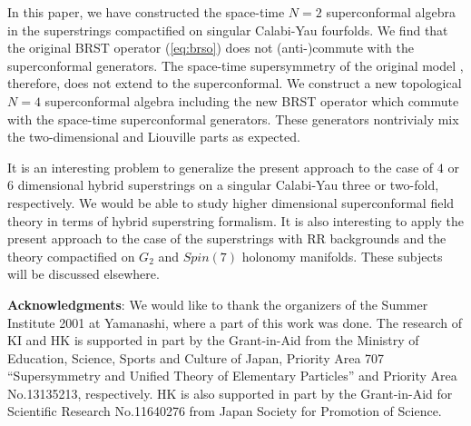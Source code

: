 \documentclass[a4paper,12pt]{article}
\begin{document}
In this paper, we have constructed the space-time $N=2$
superconformal algebra in the superstrings compactified
on singular Calabi-Yau fourfolds. We find that the original
BRST operator (\ref{eq:brso}) does not (anti-)commute with the 
superconformal
generators. The space-time supersymmetry of the original model
\cite{GKP}, therefore, does not extend to the superconformal.
We construct a new topological $N=4$ superconformal algebra
including the new BRST operator which commute with
the space-time superconformal generators. These generators
nontrivialy mix the two-dimensional and Liouville parts
as expected.

It is an interesting problem to generalize the present approach to the
case of $4$ or $6$ dimensional hybrid superstrings on a singular
Calabi-Yau three or two-fold, respectively. 
We would be able to study higher dimensional
superconformal field theory in terms of hybrid superstring formalism.
It is also interesting to apply the present approach to the case of 
the superstrings with RR backgrounds \cite{BeVaWi}
and the theory compactified on
$G_{2}$ and $Spin(7)$ holonomy manifolds\cite{ShVa}. 
These subjects will be discussed elsewhere.

\vspace{1cm}
{\bf Acknowledgments}:
We would like to thank the organizers of the Summer Institute 2001 at 
Yamanashi, where a part of this work was done.
The research of KI and HK is supported in part by the Grant-in-Aid from
the Ministry of Education, Science, Sports and Culture of Japan,
Priority Area 707 ``Supersymmetry and Unified Theory of Elementary
Particles'' and Priority Area No.13135213, respectively. HK is also
supported in part by the Grant-in-Aid for Scientific Research No.11640276
from Japan Society for Promotion of Science.
\end{document}

